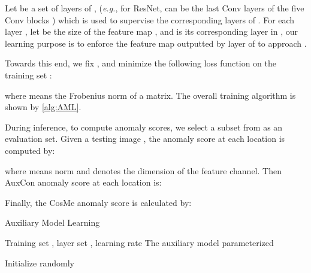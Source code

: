 \documentclass[10pt,twocolumn,letterpaper]{article}
\begin{document}
Let  be a set of layers of , (\emph{e.g.}, for ResNet,  can be the last Conv layers of the five Conv blocks ) which is used to supervise the corresponding layers of . For each layer , let  be the size of the feature map , and  is its corresponding layer in , our learning purpose is to enforce the feature map  outputted by layer  of  to approach .

Towards this end, we fix , and minimize the following loss function on the training set :

















where  means the Frobenius norm of a matrix. The overall training algorithm is shown by \cref{alg:AML}.



During inference, to compute anomaly scores, we select a subset  from  as an evaluation set. Given a testing image , the anomaly score  at each location  is computed by:

where  means  norm and  denotes the dimension of the feature channel. Then AuxCon anomaly score at each location  is:

Finally, the CosMe anomaly score  is calculated by:








\begin{algorithm}[t!]
\caption{Auxiliary Model Learning}
\label{alg:AML}
    \begin{algorithmic}[1]
    \REQUIRE Training set , layer set , learning rate 
    \ENSURE The auxiliary model parameterized 

        \STATE Initialize  randomly

            \STATE \mbox{}

\STATE 
        \ENDFOR
    \end{algorithmic}
\end{algorithm}
\end{document}
